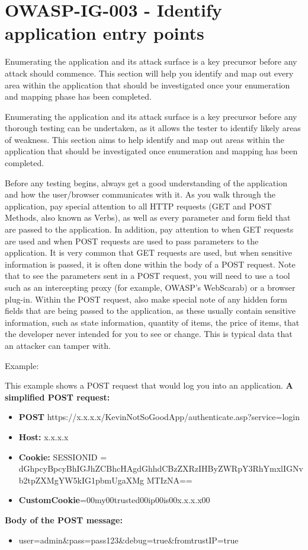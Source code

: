 		\section{OWASP-IG-003 - Identify application entry points}
			Enumerating the application and its attack surface is a key precursor before any attack 
			should commence. This section will help you identify and map out every area within the 
			application that should be investigated once your enumeration and mapping phase has been 
			completed.

			Enumerating the application and its attack surface is a key precursor before any thorough 
			testing can be undertaken, as it allows the tester to identify likely areas of weakness. 
			This section aims to help identify and map out areas within the application that should be investigated once enumeration and mapping has been completed.

			Before any testing begins, always get a good understanding of the application and how the 
			user/browser communicates with it. As you walk through the application, pay special attention 
			to all HTTP requests (GET and POST Methods, also known as Verbs), as well as every parameter 
			and form field that are passed to the application. In addition, pay attention to when
			GET requests are used and when POST requests are used to pass parameters to the application. 
			It is very common that GET requests are used, but when sensitive information is passed, it 
			is often done within the body of a POST request. Note that to see the parameters sent in a 
			POST request, you will need to use a tool such as an intercepting proxy (for example,
			OWASP's WebScarab) or a browser plug-in. Within the POST request, also make special note of 
			any hidden form fields that are being passed to the application, as these usually contain 
			sensitive information, such as state information, quantity of items, the price of items, 
			that the developer never intended for you to see or change. This is typical data that an 
			attacker can tamper with. 

			Example:

			This example shows a POST request that would log you into an application.
			{\bf A simplified POST request:}
				\begin{itemize}
					\item {\bf POST} https://x.x.x.x/KevinNotSoGoodApp/authenticate.asp?service=login
					\item {\bf Host:} x.x.x.x
					\item {\bf Cookie:} 
   					SESSIONID = dGhpcyBpcyBhIGJhZCBhcHAgdGhhdCBzZXRzIHByZWRpY3RhYmxlIGNvb2tpZXMgYW5kIG1pbmUgaXMg
  					MTIzNA==
  					\item {\bf CustomCookie}=00my00trusted00ip00is00x.x.x.x00
  				\end{itemize}
			{\bf Body of the POST message:}
				\begin{itemize}
					\item user=admin\&pass=pass123\&debug=true\&fromtrustIP=true
				\end{itemize}



